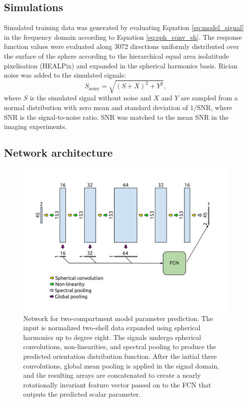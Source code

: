 \documentclass[10pt, letterpaper, oneside]{article}
\begin{document}
\subsection{Simulations}

Simulated training data was generated by evaluating Equation \ref{eq:model_signal} in the frequency domain according to Equation \ref{eq:sph_conv_sh}. The response function values were evaluated along 3072 directions uniformly distributed over the surface of the sphere according to the hierarchical equal area isolatitude pixelisation (HEALPix) \citep{gorski2005healpix, zonca2019healpy} and expanded in the spherical harmonics basis. Rician noise was added to the simulated signals:
\begin{equation}
S_{\text{noisy}} = \sqrt{ \left( S + X \right)^2 + Y^2} ,
\end{equation}
where $S$ is the simulated signal without noise and $X$ and $Y$ are sampled from a normal distribution with zero mean and standard deviation of $1/\text{SNR}$, where SNR is the signal-to-noise ratio. SNR was matched to the mean SNR in the imaging experiments.

\subsection{Network architecture}

\begin{figure}
  \centering
  \includegraphics[width=.74\linewidth]{figures/network-architecture.png}
  \caption{Network for two-compartment model parameter prediction. The input is normalized two-shell data expanded using spherical harmonics up to degree eight. The signals undergo spherical convolutions, non-linearities, and spectral pooling to produce the predicted orientation distribution function. After the initial three convolutions, global mean pooling is applied in the signal domain, and the resulting arrays are concatenated to create a nearly rotationally invariant feature vector passed on to the FCN that outputs the predicted scalar parameter.}
  \label{fig:architecture}
\end{figure}
\end{document}
